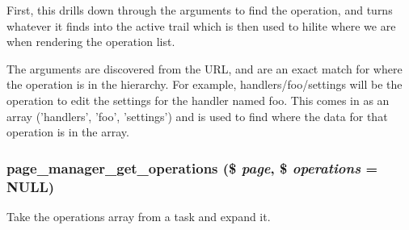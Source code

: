 First, this drills down through the arguments to find the operation, and turns whatever it finds into the active trail which is then used to hilite where we are when rendering the operation list.

The arguments are discovered from the URL, and are an exact match for where the operation is in the hierarchy. For example, handlers/foo/settings will be the operation to edit the settings for the handler named foo. This comes in as an array ('handlers', 'foo', 'settings') and is used to find where the data for that operation is in the array. \hypertarget{page__manager_8admin_8inc_a660bf3462704812598b7af309477ac25}{
\subsubsection[{page\_\-manager\_\-get\_\-operations}]{\setlength{\rightskip}{0pt plus 5cm}page\_\-manager\_\-get\_\-operations (\$ {\em page}, \/  \$ {\em operations} = {\ttfamily NULL})}}
\label{page__manager_8admin_8inc_a660bf3462704812598b7af309477ac25}
Take the operations array from a task and expand it.

